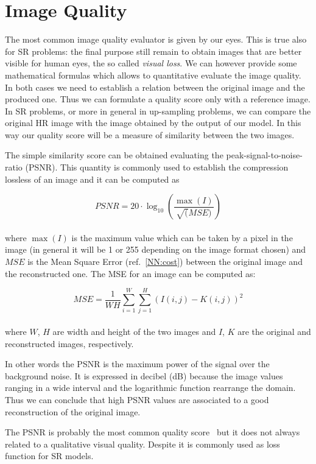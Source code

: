 \documentclass{standalone}
\begin{document}
\section[Image Quality]{Image Quality}\label{SR:quality}

The most common image quality evaluator is given by our eyes.
This is true also for SR problems: the final purpose still remain to obtain images that are better visible for human eyes, the so called \emph{visual loss}.
We can however provide some mathematical formulas which allows to quantitative evaluate the image quality.
In both cases we need to establish a relation between the original image and the produced one.
Thus we can formulate a quality score only with a reference image.
In SR problems, or more in general in up-sampling problems, we can compare the original HR image with the image obtained by the output of our model.
In this way our quality score will be a measure of similarity between the two images.

The simple similarity score can be obtained evaluating the peak-signal-to-noise-ratio (PSNR).
This quantity is commonly used to establish the compression lossless of an image and it can be computed as

$$
PSNR = 20 \cdot \log_{10}\left( \frac{\max(I)}{\sqrt(MSE)} \right)
$$
\\
where $\max(I)$ is the maximum value which can be taken by a pixel in the image (in general it will be 1 or 255 depending on the image format chosen) and $MSE$ is the Mean Square Error (ref.~\ref{NN:cost}) between the original image and the reconstructed one.
The MSE for an image can be computed as:

$$
MSE = \frac{1}{WH} \sum_{i=1}^{W}\sum_{j=1}^{H} \left( I(i, j) - K(i, j) \right)^2
$$
\\
where $W$, $H$ are width and height of the two images and $I$, $K$ are the original and reconstructed images, respectively.

In other words the PSNR is the maximum power of the signal over the background noise.
It is expressed in decibel (dB) because the image values ranging in a wide interval and the logarithmic function rearrange the domain.
Thus we can conclude that high PSNR values are associated to a good reconstruction of the original image.

The PSNR is probably the most common quality score~\cite{psnr_ssim} but it does not always related to a qualitative visual quality.
Despite it is commonly used as loss function for SR models.
\end{document}
